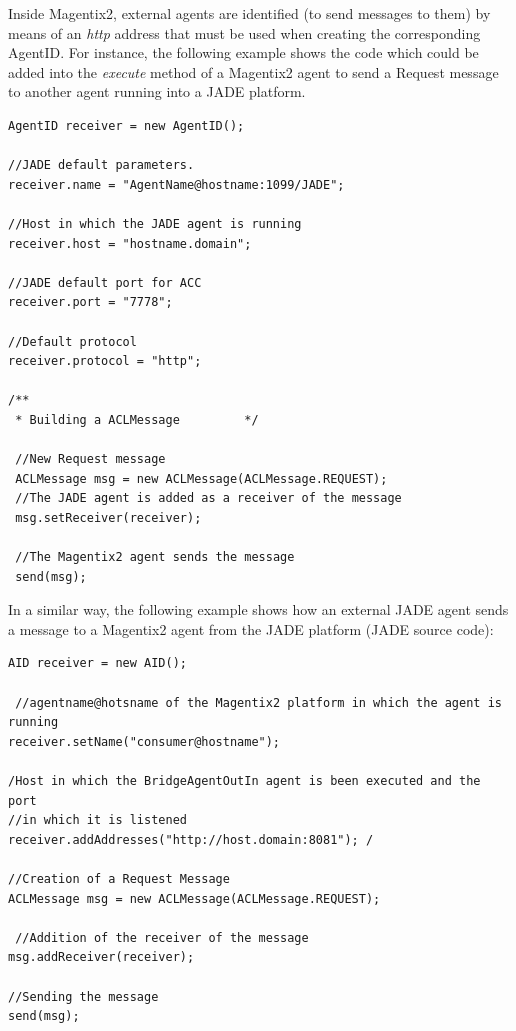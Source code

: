 %
%




Inside Magentix2, external agents are identified (to send messages to them) by means of an \textit{http} address that must be used when creating the corresponding AgentID. For instance, the following example shows the code which could be added into the \textit{execute} method of a Magentix2 agent to send a Request message to another agent running into a JADE platform.

\begin{lstlisting}
AgentID receiver = new AgentID();

//JADE default parameters.
receiver.name = "AgentName@hostname:1099/JADE";

//Host in which the JADE agent is running
receiver.host = "hostname.domain";

//JADE default port for ACC
receiver.port = "7778";

//Default protocol
receiver.protocol = "http";

/**
 * Building a ACLMessage         */

 //New Request message
 ACLMessage msg = new ACLMessage(ACLMessage.REQUEST);
 //The JADE agent is added as a receiver of the message
 msg.setReceiver(receiver);

 //The Magentix2 agent sends the message
 send(msg);
\end{lstlisting}

In a similar way, the following example shows how an external JADE agent sends a message to a Magentix2 agent from the JADE platform (JADE source code):


\begin{lstlisting}
AID receiver = new AID();

 //agentname@hotsname of the Magentix2 platform in which the agent is running
receiver.setName("consumer@hostname");

/Host in which the BridgeAgentOutIn agent is been executed and the port
//in which it is listened
receiver.addAddresses("http://host.domain:8081"); /

//Creation of a Request Message
ACLMessage msg = new ACLMessage(ACLMessage.REQUEST);

 //Addition of the receiver of the message
msg.addReceiver(receiver);

//Sending the message
send(msg);
\end{lstlisting}

